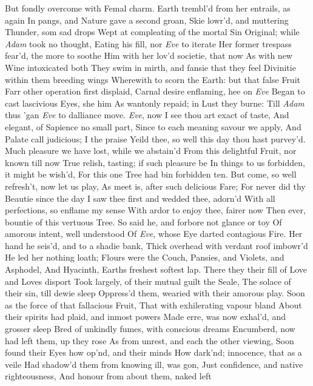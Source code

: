 \documentclass[11pt]{book}
\newcounter {first}
\begin{document}
But fondly overcome with Femal charm. 
Earth trembl'd from her entrails, as again 
In pangs, and Nature gave a second groan, 
Skie lowr'd, and muttering Thunder, som sad drops 
Wept at compleating of the mortal Sin 
Original; while \textit{Adam} took no thought, 
Eating his fill, nor \textit{Eve} to iterate 
Her former trespass fear'd, the more to soothe 
Him with her lov'd societie, that now 
As with new Wine intoxicated both 
They swim in mirth, and fansie that they feel 
Divinitie within them breeding wings 
Wherewith to scorn the Earth: but that false Fruit 
Farr other operation first displaid, 
Carnal desire enflaming, hee on \textit{Eve} 
Began to cast lascivious Eyes, she him 
As wantonly repaid; in Lust they burne: 
Till \textit{Adam} thus 'gan \textit{Eve} to dalliance move. 
\quad \textit{Eve}, now I see thou art exact of taste, 
And elegant, of Sapience no small part, 
Since to each meaning savour we apply, 
And Palate call judicious; I the praise 
Yeild thee, so well this day thou hast purvey'd. 
Much pleasure we have lost, while we abstain'd 
From this delightful Fruit, nor known till now 
True relish, tasting; if such pleasure be 
In things to us forbidden, it might be wish'd, 
For this one Tree had bin forbidden ten. 
But come, so well refresh't, now let us play, 
As meet is, after such delicious Fare; 
For never did thy Beautie since the day 
I saw thee first and wedded thee, adorn'd 
With all perfections, so enflame my sense 
With ardor to enjoy thee, fairer now 
Then ever, bountie of this vertuous Tree. 
\quad So said he, and forbore not glance or toy 
Of amorous intent, well understood 
Of \textit{Eve}, whose Eye darted contagious Fire. 
Her hand he seis'd, and to a shadie bank, 
Thick overhead with verdant roof imbowr'd 
He led her nothing loath; Flours were the Couch, 
Pansies, and Violets, and Asphodel, 
And Hyacinth, Earths freshest softest lap. 
There they their fill of Love and Loves disport 
Took largely, of their mutual guilt the Seale, 
The solace of their sin, till dewie sleep 
Oppress'd them, wearied with their amorous play. 
Soon as the force of that fallacious Fruit, 
That with exhilerating vapour bland 
About their spirits had plaid, and inmost powers 
Made erre, was now exhal'd, and grosser sleep 
Bred of unkindly fumes, with conscious dreams 
Encumberd, now had left them, up they rose 
As from unrest, and each the other viewing, 
Soon found their Eyes how op'nd, and their minds 
How dark'nd; innocence, that as a veile 
Had shadow'd them from knowing ill, was gon, 
Just confidence, and native righteousness, 
And honour from about them, naked left 
\end{document}
